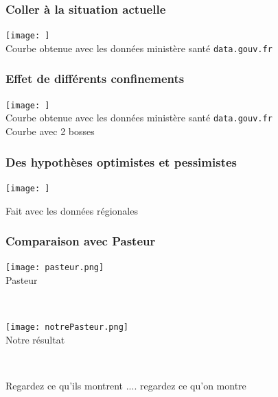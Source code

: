 \documentclass[a4paper]{cours-bdd}
\begin{document}
\begin{frame}[fragile]
  \frametitle{Coller à la situation actuelle}

  \begin{center}
    \texttt{[image: ]} \\
    Courbe obtenue avec les données ministère santé \texttt{data.gouv.fr}
  \end{center}
  
\end{frame}




\begin{frame}[fragile]
  \frametitle{Effet de différents confinements}


  \begin{center}
    \texttt{[image: ]} \\
    Courbe obtenue avec les données ministère santé \texttt{data.gouv.fr}\\
    Courbe avec 2 bosses
  \end{center}
  
\end{frame}


\begin{frame}[fragile]
  \frametitle{Des hypothèses optimistes et pessimistes}
  \begin{center}
        \texttt{[image: ]} \\
  \end{center}
Fait avec les données régionales
  
\end{frame}



\begin{frame}[fragile]
  \frametitle{Comparaison avec Pasteur}

  \begin{minipage}[b]{0.45\columnwidth}
    \vspace{0.0cm}
    \texttt{[image: pasteur.png]} \\
    Pasteur 
      \end{minipage}    
  \hfill \ 
  \begin{minipage}[b]{0.45\columnwidth}
        \vspace{0.0cm}
        \texttt{[image: notrePasteur.png]} \\
        Notre résultat
      \end{minipage}
      \

  Regardez ce qu'ils montrent .... regardez ce qu'on montre 
\end{frame}
\end{document}
